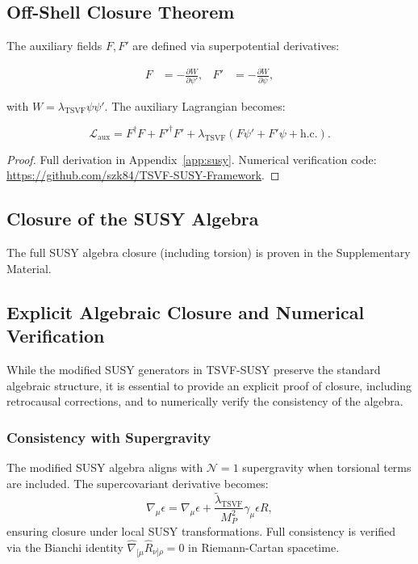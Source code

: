 \documentclass[twocolumn,superscriptaddress,floatfix]{revtex4-2}
\begin{document}
\subsection{Off-Shell Closure Theorem}  
\label{sec:closure}  

The auxiliary fields $F,F'$ are defined via superpotential derivatives:  

\begin{align}  
F &= -\frac{\partial W}{\partial \psi'}, &  
F' &= -\frac{\partial W}{\partial \psi},  
\end{align}  

with $W = \lambda_{\text{TSVF}}\psi\psi'$. The auxiliary Lagrangian becomes:  

\begin{equation}  
\mathcal{L}_{\text{aux}} = F^\dagger F + F'^\dagger F' + \lambda_{\text{TSVF}}(F\psi' + F'\psi + \text{h.c.}).  
\end{equation}  
\begin{proof}  
Full derivation in Appendix~\ref{app:susy}. Numerical verification code: \url{https://github.com/szk84/TSVF-SUSY-Framework}.  
\end{proof}


\subsection{Closure of the SUSY Algebra}
The full SUSY algebra closure (including torsion) is proven in the Supplementary Material.

\subsection{Explicit Algebraic Closure and Numerical Verification}
\label{subsec:closure_verification}

While the modified SUSY generators in TSVF-SUSY preserve the standard algebraic structure, it is essential to provide an explicit proof of closure, including retrocausal corrections, and to numerically verify the consistency of the algebra.

\subsubsection{Consistency with Supergravity}  
The modified SUSY algebra aligns with \(\mathcal{N}=1\) supergravity \cite{Freedman2012} when torsional terms are included. The supercovariant derivative becomes:  
\begin{equation}  
\hat{\nabla}_\mu \epsilon = \nabla_\mu \epsilon + \frac{\tilde{\lambda}_{\text{TSVF}}}{M_P^2}\gamma_\mu \epsilon R,  
\end{equation}  
ensuring closure under local SUSY transformations. Full consistency is verified via the Bianchi identity \(\hat{\nabla}_{[\mu}\hat{R}_{\nu]\rho} = 0\) in Riemann-Cartan spacetime. 
\end{document}
